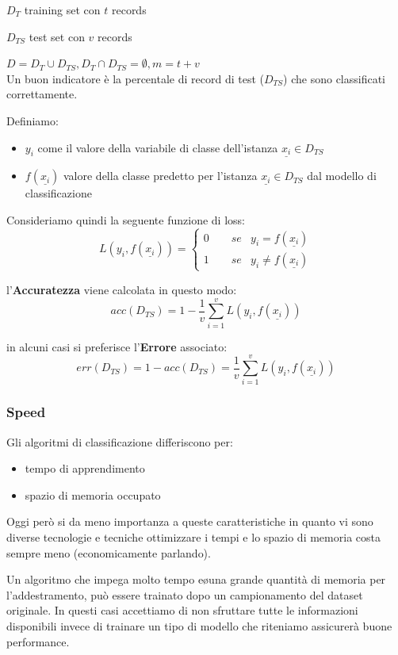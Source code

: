 $D_T$ training set con $t$ records

$D_{TS}$ test set con $v$ records

$D = D_T \cup D_{TS},D_T \cap D_{TS} = \emptyset,m = t + v$\\

Un buon indicatore è la percentale di record di test ($D_{TS}$) che sono classificati correttamente. 

Definiamo:
\begin{itemize}
	\item $y_i$ come il valore della variabile di classe dell'istanza $\underline{x_i} \in D_{TS}$
	\item $f(\underline{x_i})$ valore della classe predetto per l'istanza $\underline{x_i} \in D_{TS}$ dal modello di classificazione
\end{itemize} 
Consideriamo quindi la seguente funzione di loss:
\[
L(y_i, f(\underline{x_i})) =  
\begin{cases}
	0 \qquad se &y_i = f(\underline{x_i}) \\
	1 \qquad se &y_i \ne f(\underline{x_i})
\end{cases}
\]

l'\textbf{Accuratezza} viene calcolata in questo modo:
\[ acc(D_{TS}) = 1 - \frac{1}{v} \sum_{i=1}^{v} L(y_i, f(\underline{x_i}))\]

in alcuni casi si preferisce l'\textbf{Errore} associato:
\[err(D_{TS}) = 1 - acc(D_{TS}) = \frac{1}{v} \sum_{i=1}^{v} L(y_i, f(\underline{x_i}))\]

\subsubsection{Speed}
Gli algoritmi di classificazione differiscono per:
\begin{itemize}
	\item tempo di apprendimento
	\item spazio di memoria occupato
\end{itemize}
Oggi per\`o si da meno importanza a queste caratteristiche in quanto vi sono diverse tecnologie e tecniche ottimizzare i tempi e lo spazio di memoria costa sempre meno (economicamente parlando).

Un algoritmo che impega molto tempo e\o una grande quantità di memoria per l'addestramento, pu\`o essere trainato dopo un campionamento del dataset originale. In questi casi accettiamo di non sfruttare tutte le informazioni disponibili invece di trainare un tipo di modello che riteniamo assicurerà buone performance.

